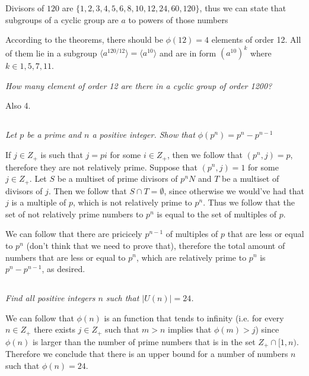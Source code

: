 \documentclass[11pt,oneside,titlepage]{book}
\newcommand{\eangle}[1]{\langle #1 \rangle}
\newcommand{\set}[1]{\{ #1 \}}
\begin{document}
Divisors of $120$ are $\set{1, 2, 3, 4, 5, 6, 8, 10, 12, 24, 60, 120}$, thus
we can state that subgroups of a cyclic group are $a$ to powers of those numbers

According to the theorems, there should be $\phi(12) = 4$ elements of order 12.
All of them lie in a subgroup $\eangle{a^{120 / 12}} = \eangle{a^{10}}$
and are in form $(a^{10})^k$ where $k \in {1, 5, 7, 11}$. 

\textit{How many element of order 12 are there in a cyclic group of order 1200?}

Also 4.

\subsection{}

\textit{Let $p$ be a prime  and $n$ a positive integer. Show that $\phi(p^n) = p^n - p^{n - 1}$}

If $j \in Z_+$ is such that $j = pi$ for some $i \in Z_+$, then we follow that
$(p^n, j) = p$, therefore they are not relatively prime. Suppose that $(p^n, j) = 1$ for some
$j \in Z_+$. Let $S$ be a multiset of prime divisors of $p^nN$ and $T$ be a multiset
of divisors of $j$. Then we follow that $S \cap T = \emptyset$, since otherwise we
would've had that $j$ is a multiple of $p$, which is not relatively prime to $p^n$.
Thus we follow that the set of not relatively prime numbers to  $p^n$ is equal to
the set of multiples of $p$.

We can follow that there are pricicely $p^{n - 1}$ of multiples of $p$ that are
less or equal to $p^n$ (don't think that we need to prove that),
therefore the total amount of numbers that are less or equal to
$p^n$, which are relatively prime to $p^n$ is $p^n - p^{n - 1}$, as desired.

\subsection{}

\textit{Find all positive integers $n$ such that $|U(n)| = 24$.}

We can follow that $\phi(n)$ is an function that tends to infinity
(i.e. for every $n \in Z_+$ there exists $j \in Z_+$ such that
$m > n$ implies that $\phi(m) > j$) since $\phi(n)$ is larger than
the number of prime numbers that is in the set $Z_+ \cap [1, n)$.
Therefore we conclude that there is an upper bound for a number of
numbers $n$ such that $\phi(n) = 24$.
\end{document}
